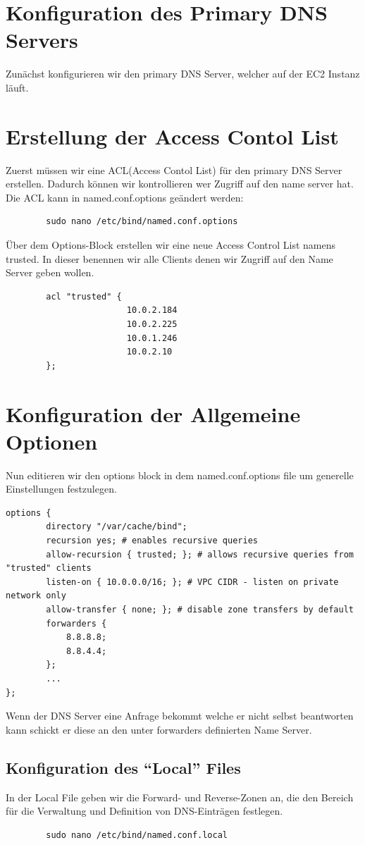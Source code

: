 \documentclass[a4paper,12pt]{article}
\begin{document}
\section{Konfiguration des Primary DNS Servers}
Zunächst konfigurieren wir den primary DNS Server, welcher auf der EC2 Instanz läuft.

\section{Erstellung der Access Contol List}
Zuerst müssen wir eine ACL(Access Contol List) für den primary DNS Server erstellen. Dadurch können wir kontrollieren wer Zugriff auf den name server hat.
Die ACL kann in named.conf.options geändert werden:
\begin{verbatim}
		sudo nano /etc/bind/named.conf.options
\end{verbatim}


Über dem Options-Block erstellen wir eine neue Access Control List namens trusted. In dieser benennen wir alle Clients denen wir Zugriff auf den Name Server geben wollen.
\begin{verbatim}
		acl "trusted" {
						10.0.2.184
						10.0.2.225
						10.0.1.246
						10.0.2.10
		};
\end{verbatim}


\section{Konfiguration der Allgemeine Optionen}
Nun editieren wir den options block in dem named.conf.options file um generelle Einstellungen festzulegen.
\begin{verbatim}
options {
		directory "/var/cache/bind";
		recursion yes; # enables recursive queries
		allow-recursion { trusted; }; # allows recursive queries from "trusted" clients
		listen-on { 10.0.0.0/16; }; # VPC CIDR - listen on private network only
		allow-transfer { none; }; # disable zone transfers by default
		forwarders {
			8.8.8.8;
			8.8.4.4;
		};
		...
};
\end{verbatim}
Wenn der DNS Server eine Anfrage bekommt welche er nicht selbst beantworten kann schickt er diese an den unter forwarders definierten Name Server.


\subsection{Konfiguration des “Local” Files}
In der Local File geben wir die Forward- und Reverse-Zonen an, die den Bereich für die Verwaltung und Definition von DNS-Einträgen festlegen.
\begin{verbatim}
		sudo nano /etc/bind/named.conf.local
\end{verbatim}
\end{document}
